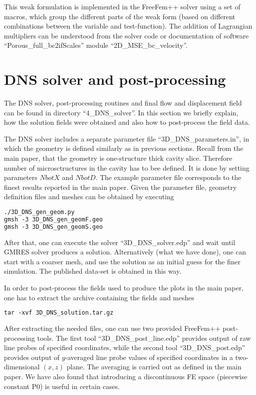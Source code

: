 \documentclass[12pt,a4paper]{article}
\begin{document}
This weak formulation is implemented in the FreeFem++ solver using a set of macros, which group the different parts of the weak form (based on different combinations between the variable and test-function). The addition of Lagrangian multipliers can be understood from the solver code or documentation of software ``Porous\_full\_bc2ifScales'' module ``2D\_MSE\_bc\_velocity''.


\section{DNS solver and post-processing}

The DNS solver, post-processing routines and final flow and displacement field can be found in directory ``4\_DNS\_solver''. In this section we briefly explain, how the solution fields were obtained and also how to post-process the field data.

The DNS solver includes a separate parameter file ``3D\_DNS\_parameters.in'', in which the geometry is defined similarly as in previous sections. Recall from the main paper, that the geometry is one-structure thick cavity slice. Therefore number of microsctructures in the cavity has to bee defined. It is done by setting parameters $NbotX$ and $NbotD$. The example parameter file corresponds to the finest results reported in the main paper. Given the parameter file, geometry definition files and meshes can be obtained by executing
\begin{lstlisting}[language=tex]
./3D_DNS_gen_geom.py
gmsh -3 3D_DNS_gen_geomF.geo
gmsh -3 3D_DNS_gen_geomS.geo
\end{lstlisting}
After that, one can execute the solver ``3D\_DNS\_solver.edp'' and wait until GMRES solver produces a solution. Alternatively (what we have done), one can start with a coarser mesh, and use the solution as an initial guess for the finer simulation. The published data-set is obtained in this way.

In order to post-process the fields used to produce the plots in the main paper, one has to extract the archive containing the fields and meshes
\begin{lstlisting}[language=tex]
tar -xvf 3D_DNS_solution.tar.gz
\end{lstlisting}

After extracting the needed files, one can use two provided FreeFem++ post-processing tools. The first tool ``3D\_DNS\_post\_line.edp'' provides output of raw line probes of specified coordinates, while the second tool ``3D\_DNS\_post.edp'' provides output of $y$-averaged line probe values of specified coordinates in a two-dimensional $(x,z)$ plane. The averaging is carried out as defined in the main paper. We have also found that introducing a discontinuous FE space (piecewise constant P0) is useful in certain cases.
\end{document}
